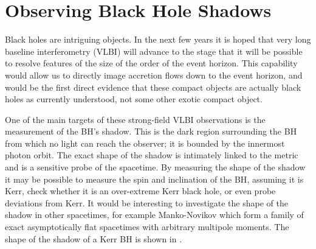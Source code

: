 \section{Observing Black Hole Shadows}

Black holes are intriguing objects. In the next few years it is hoped that very long baseline interferometry (VLBI) will advance to the stage that it will be possible to resolve features of the size of the order of the event horizon\cite{Doeleman2008}. This capability would allow us to directly image accretion flows down to the event horizon, and would be the first direct evidence that these compact objects are actually black holes as currently understood, not some other exotic compact object.

One of the main targets of these strong-field VLBI observations is the measurement of the BH's shadow. This is the dark region surrounding the BH from which no light can reach the observer; it is bounded by the innermost photon orbit\cite{Chandrasekhar1998}. The exact shape of the shadow is intimately linked to the metric and is a sensitive probe of the spacetime. By measuring the shape of the shadow it may be possible to measure the spin and inclination of the BH\cite{Hioki2009a}, assuming it is Kerr, check whether it is an over-extreme Kerr black hole\cite{Bambi2009}, or even probe deviations from Kerr\cite{Johannsen2010a, Johannsen2010b}. It would be interesting to investigate the shape of the shadow in other spacetimes, for example Manko-Novikov\cite{Manko1992, Gair2008a} which form a family of exact asymptotically flat spacetimes with arbitrary multipole moments. The shape of the shadow of a Kerr BH is shown in .
